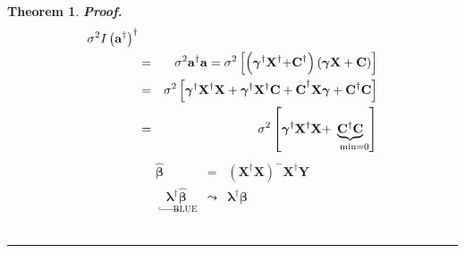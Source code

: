 \documentclass{article}
\newtheorem{theorem}{Theorem}
\newenvironment{proof}[1][Proof]{\noindent\textbf{#1.} }{\ \rule{0.5em}{0.5em}}
\begin{document}
\begin{theorem}
\begin{proof}
\begin{eqnarray*}
{}\sigma ^{2}I\left( \mathbf{a}^{\dagger }\right) ^{\dagger } \\
&=&\sigma ^{2}\mathbf{a}^{\dagger }\mathbf{a}=\sigma ^{2}\left[ \left( 
\mathbf{\gamma }^{\dagger }\mathbf{X}^{\dagger }\mathbf{+C}^{\dagger
}\right) \left( \mathbf{\gamma X+C}\right) \right] \\
&=&\sigma ^{2}\left[ \mathbf{\gamma }^{\dagger }\mathbf{X}^{\dagger }\mathbf{%
X+\mathbf{\gamma }^{\dagger }\mathbf{X}^{\dagger }C+C}^{\dagger }\mathbf{%
X\gamma +C}^{\dagger }\mathbf{C}\right] \\
&=&\sigma ^{2}\left[ \mathbf{\gamma }^{\dagger }\mathbf{X}^{\dagger }\mathbf{%
X+}\underset{\text{min=0}}{\underbrace{\mathbf{C}^{\dagger }\mathbf{C}}}%
\right]
\end{eqnarray*}%
\begin{eqnarray*}
\mathbf{\hat{\beta}} &=&\left( \mathbf{X}^{\dagger }\mathbf{X}\right) ^{-}%
\mathbf{X}^{\dagger }\mathbf{Y} \\
\underset{\quad \hookrightarrow \text{BLUE}}{\mathbf{\lambda }^{\dagger }%
\mathbf{\hat{\beta}}} &\mathbf{\leadsto }&\mathbf{\lambda }^{\dagger }%
\mathbf{\beta }
\end{eqnarray*}
\end{proof}
\end{theorem}
\end{document}
